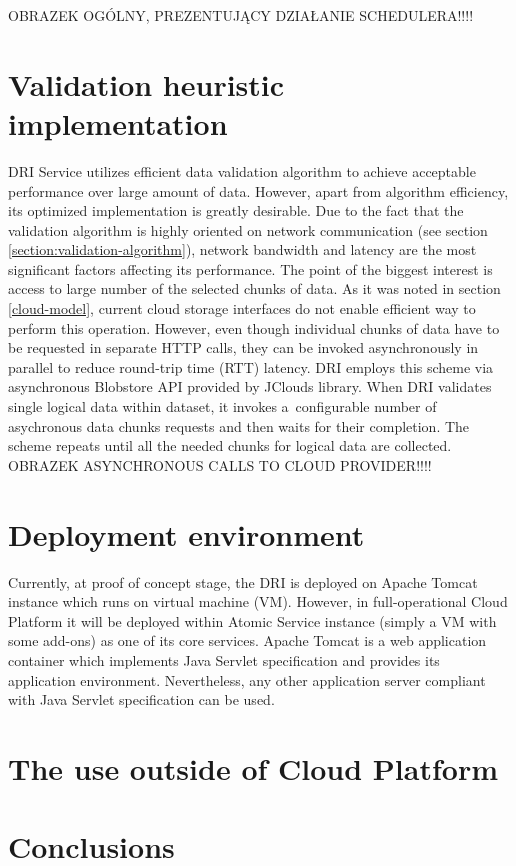OBRAZEK OGÓLNY, PREZENTUJĄCY DZIAŁANIE SCHEDULERA!!!!

	\section{Validation heuristic implementation}
DRI Service utilizes efficient data validation algorithm to achieve acceptable
performance over large amount of data. However, apart from algorithm
efficiency, its optimized implementation is greatly desirable. Due to the fact
that the validation algorithm is highly oriented on network communication (see
section \ref{section:validation-algorithm}), network bandwidth and latency are
the most significant factors affecting its performance. The point of the
biggest interest is access to large number of the selected chunks of data. As
it was noted in section \ref{cloud-model}, current cloud storage interfaces do
not enable efficient way to perform this operation. However, even though
individual chunks of data have to be requested in separate HTTP calls, they can
be invoked asynchronously in parallel to reduce round-trip time (RTT) latency.
DRI employs this scheme via asynchronous Blobstore API provided by JClouds
library. When DRI validates single logical data within dataset, it invokes
a~configurable number of asychronous data chunks requests and then waits for
their completion. The scheme repeats until all the needed chunks for logical
data are collected.\\

OBRAZEK ASYNCHRONOUS CALLS TO CLOUD PROVIDER!!!!  

	\section{Deployment environment}
Currently, at proof of concept stage, the DRI is deployed on Apache Tomcat
\cite{apache-tomcat} instance which runs on virtual machine (VM). However, in
full-operational Cloud Platform it will be deployed within Atomic Service
instance (simply a VM with some add-ons) as one of its core services. Apache
Tomcat is a web application container which implements Java Servlet
specification and provides its application environment. Nevertheless, any other
application server compliant with Java Servlet specification can be used.

	\section{The use outside of Cloud Platform}

	\section{Conclusions}
